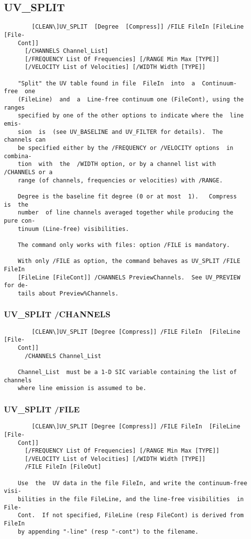 \subsection{UV\_SPLIT}
\begin{verbatim}
        [CLEAN\]UV_SPLIT  [Degree  [Compress]] /FILE FileIn [FileLine [File-
    Cont]]
      [/CHANNELS Channel_List]
      [/FREQUENCY List Of Frequencies] [/RANGE Min Max [TYPE]]
      [/VELOCITY List of Velocities] [/WIDTH Width [TYPE]]

    "Split" the UV table found in file  FileIn  into  a  Continuum-free  one
    (FileLine)  and  a  Line-free continuum one (FileCont), using the ranges
    specified by one of the other options to indicate where the  line  emis-
    sion  is  (see UV_BASELINE and UV_FILTER for details).  The channels can
    be specified either by the /FREQUENCY or /VELOCITY options  in  combina-
    tion  with  the  /WIDTH option, or by a channel list with /CHANNELS or a
    range (of channels, frequencies or velocities) with /RANGE.

    Degree is the baseline fit degree (0 or at most  1).   Compress  is  the
    number  of line channels averaged together while producing the pure con-
    tinuum (Line-free) visibilities.

    The command only works with files: option /FILE is mandatory.

    With only /FILE as option, the command behaves as UV_SPLIT /FILE  FileIn
    [FileLine [FileCont]] /CHANNELS PreviewChannels.  See UV_PREVIEW for de-
    tails about Preview%Channels.

\end{verbatim}
\subsubsection{UV\_SPLIT /CHANNELS}
\begin{verbatim}
        [CLEAN\]UV_SPLIT [Degree [Compress]] /FILE FileIn  [FileLine  [File-
    Cont]]
      /CHANNELS Channel_List

    Channel_List  must be a 1-D SIC variable containing the list of channels
    where line emission is assumed to be.

\end{verbatim}
\subsubsection{UV\_SPLIT /FILE}
\begin{verbatim}
        [CLEAN\]UV_SPLIT [Degree [Compress]] /FILE FileIn  [FileLine  [File-
    Cont]]
      [/FREQUENCY List Of Frequencies] [/RANGE Min Max [TYPE]]
      [/VELOCITY List of Velocities] [/WIDTH Width [TYPE]]
      /FILE FileIn [FileOut]

    Use  the  UV data in the file FileIn, and write the continuum-free visi-
    bilities in the file FileLine, and the line-free visibilities  in  File-
    Cont.  If not specified, FileLine (resp FileCont) is derived from FileIn
    by appending "-line" (resp "-cont") to the filename.

\end{verbatim}
